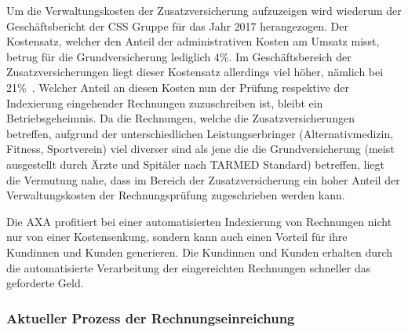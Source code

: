 Um die Verwaltungskosten der Zusatzversicherung aufzuzeigen wird wiederum der Ge\-schäfts\-be\-richt der CSS Gruppe für das Jahr 2017 herangezogen. Der Kostensatz, welcher den Anteil der administrativen Kosten am Umsatz misst, betrug für die Grundversicherung lediglich 4\%. Im Geschäftsbereich der Zusatzversicherungen liegt dieser Kostensatz allerdings viel höher, nämlich bei 21\%~\autocite{CSSGruppe2018}. Welcher Anteil an diesen Kosten nun der Prüfung respektive der Indexierung eingehender Rechnungen zuzuschreiben ist, bleibt ein Betriebsgeheimnis. Da die Rechnungen, welche die Zusatzversicherungen betreffen, aufgrund der unterschiedlichen Leistungserbringer (Alternativmedizin, Fitness, Sportverein) viel diverser sind als jene die die Grundversicherung (meist ausgestellt durch Ärzte und Spitäler nach TARMED Standard) betreffen, liegt die Vermutung nahe, dass im Bereich der Zusatzversicherung ein hoher Anteil der Verwaltungskosten der Rechnungsprüfung zugeschrieben werden kann.

Die AXA profitiert bei einer automatisierten Indexierung von Rechnungen nicht nur von einer Kostensenkung, sondern kann auch einen Vorteil für ihre Kundinnen und Kunden generieren. Die Kundinnen und Kunden erhalten durch die automatisierte Verarbeitung der eingereichten Rechnungen schneller das geforderte Geld.




\subsubsection{Aktueller Prozess der Rechnungseinreichung}

